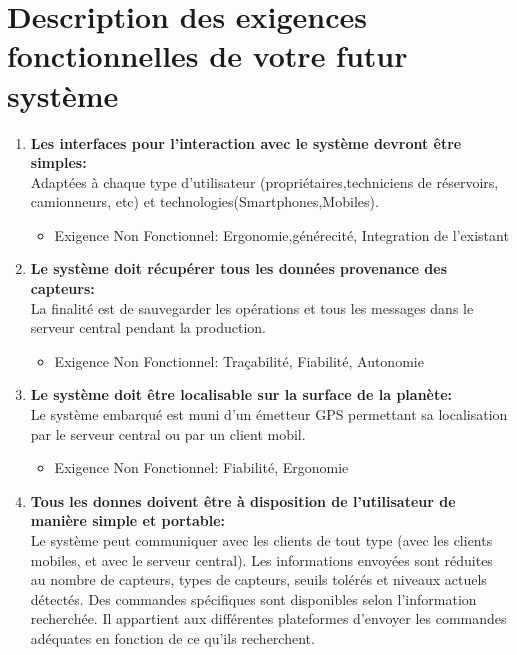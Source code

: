 \section{Description des exigences fonctionnelles de votre futur système}
\begin{enumerate}



\item  \textbf{Les interfaces pour l'interaction avec le système devront être simples:}\\
Adaptées à chaque type d'utilisateur (propriétaires,techniciens de réservoirs, camionneurs, etc) et technologies(Smartphones,Mobiles).
\begin{itemize}

\item Exigence Non Fonctionnel: Ergonomie,générecité, Integration de l'existant
\end{itemize}
\item  \textbf{Le système doit récupérer tous les données provenance des capteurs:}\\
La finalité est de sauvegarder les opérations et tous les messages dans le serveur central pendant la production.
\begin{itemize}

\item Exigence Non Fonctionnel: Traçabilité, Fiabilité, Autonomie
\end{itemize}
\item  \textbf{Le système doit être localisable sur la surface de la planète:}\\
Le système embarqué est muni d'un émetteur GPS permettant sa localisation par le serveur central ou par un client mobil.
\begin{itemize}

\item Exigence Non Fonctionnel: Fiabilité, Ergonomie
\end{itemize}
\item  \textbf{Tous les donnes doivent être à disposition de l'utilisateur de manière simple et portable:}\\
Le système peut communiquer avec les clients de tout type (avec les clients mobiles, et avec le serveur central). Les informations envoyées sont réduites au nombre de capteurs, types de capteurs, seuils tolérés et niveaux actuels détectés. Des commandes spécifiques sont disponibles selon l'information recherchée. Il appartient aux différentes plateformes d'envoyer les commandes adéquates en fonction de ce qu'ils recherchent.
\begin{itemize}


\end{itemize}
\end{enumerate}
